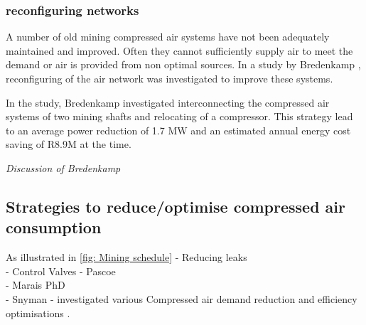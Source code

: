 		\subsubsection{reconfiguring networks}
		A number of old mining compressed air systems  have not been adequately maintained and improved. Often they cannot sufficiently supply air to meet the demand or air is provided from non optimal sources. In a study by Bredenkamp \cite{Bredenkamp2013Masters}, reconfiguring of the air network was investigated to improve these systems.
		\par  
		In the study, Bredenkamp investigated interconnecting the compressed air systems of two mining shafts and relocating of a compressor. This strategy lead to an average power reduction of 1.7 MW and an estimated annual energy cost saving of R8.9M at the time.
		\par 
		\textit{Discussion of Bredenkamp}
		
		
	\subsection{Strategies to reduce/optimise compressed air consumption}
	As illustrated in \cref{fig: Mining schedule}
		- Reducing leaks\\
		- Control Valves - Pascoe\\
		- Marais PhD\\
		- Snyman - investigated various Compressed air demand reduction and efficiency
		 optimisations \cite{Snyman2011Masters}.
		 
